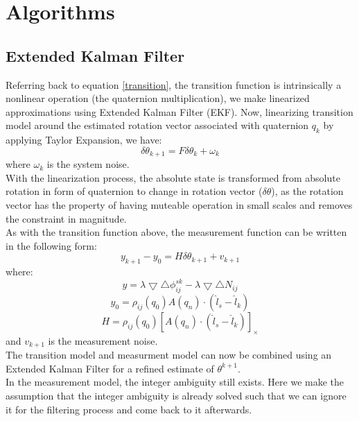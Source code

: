 \documentclass[journal,onecolumn]{IEEEtran}
\begin{document}
\section{Algorithms}
\subsection{Extended Kalman Filter}
Referring back to equation \ref{transition}, the transition function is intrinsically
a nonlinear operation (the quaternion multiplication),
we make linearized approximations using Extended Kalman Filter (EKF).
Now, linearizing transition model around the estimated rotation vector
associated with quaternion $q_k$ by applying Taylor Expansion, we have:
\begin{equation}
  \delta \theta_{k+1} = F \delta \theta_{k} + \omega_k
\end{equation}
where $\omega_k$ is the system noise.\\
With the linearization process, the absolute state is transformed from absolute
rotation in form of quaternion to change in rotation vector ($\delta \theta$),
as the rotation vector has the property of having muteable operation in small scales and
removes the constraint in magnitude.\\
As with the transition function above, the measurement function can be written
in the following form:\\
\begin{equation}
  y_{k+1}-y_0 = H\delta \theta_{k+1} + v_{k+1}
\end{equation}
where:
\begin{equation}
  y = \lambda \bigtriangledown \bigtriangleup \phi_{ij}^{sk} -
  \lambda\bigtriangledown \bigtriangleup N_{ij}
\end{equation}
\begin{equation}
  y_0 = \rho_{ij}(q_0)A(q_n)\cdot(\hat{l}_s-\hat{l}_k)
\end{equation}
\begin{equation}
  H = \rho_{ij}(q_0)[A(q_n)\cdot(\hat{l}_s-\hat{l}_k)]_{\times}
\end{equation}
and $v_{k+1}$ is the measurement noise.\\
The transition model and measurment model can now be combined using an
Extended Kalman Filter for a refined estimate of $\theta^{k+1}$.\\
In the measurement model, the integer ambiguity still exists.
Here we make the assumption that the integer ambiguity is already solved
such that we can ignore it for the filtering process and come back to it afterwards.\\
\end{document}
